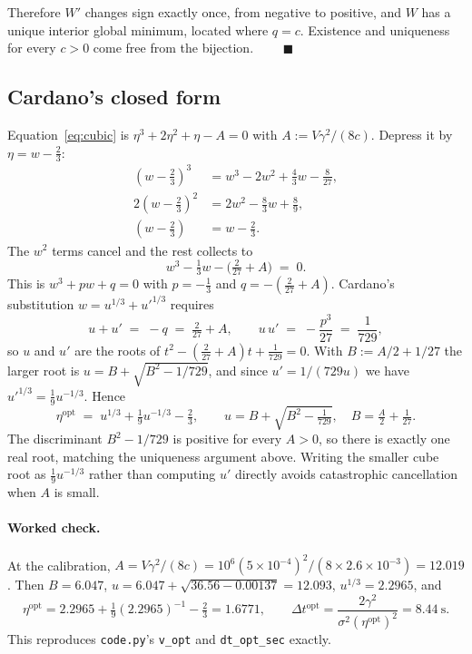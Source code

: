 \documentclass[11pt]{article}
\theoremstyle{definition}
\theoremstyle{remark}
\newcommand{\dt}{\Delta t}
\newcommand{\1}{\mathbf{1}}
\begin{document}
Therefore $W'$ changes sign exactly once, from negative to positive, and $W$ has a unique interior global minimum, located where $q = c$. Existence and uniqueness for every $c > 0$ come free from the bijection. $\qquad\blacksquare$

\subsection{Cardano's closed form}

Equation~\eqref{eq:cubic} is $\eta^3 + 2\eta^2 + \eta - A = 0$ with $A := V\gamma^2/(8c)$. Depress it by $\eta = w - \tfrac23$:
\begin{align*}
(w-\tfrac23)^3 &= w^3 - 2w^2 + \tfrac43 w - \tfrac{8}{27},\\
2(w-\tfrac23)^2 &= 2w^2 - \tfrac83 w + \tfrac89,\\
(w-\tfrac23) &= w - \tfrac23 .
\end{align*}
The $w^2$ terms cancel and the rest collects to
\[
w^3 - \tfrac13 w - \big(\tfrac{2}{27} + A\big) \;=\; 0 .
\]
This is $w^3 + pw + q = 0$ with $p = -\tfrac13$ and $q = -(\tfrac2{27}+A)$. Cardano's substitution $w = u^{1/3} + u'^{1/3}$ requires
\[
u + u' \;=\; -q \;=\; \tfrac{2}{27} + A,
\qquad
u\,u' \;=\; -\frac{p^3}{27} \;=\; \frac{1}{729},
\]
so $u$ and $u'$ are the roots of $t^2 - (\tfrac2{27}+A)t + \tfrac1{729} = 0$. With $B := A/2 + 1/27$ the larger root is $u = B + \sqrt{B^2 - 1/729}$, and since $u' = 1/(729u)$ we have $u'^{1/3} = \tfrac19 u^{-1/3}$. Hence
\begin{equation}\label{eq:cardano}
\boxed{\;\eta^{\mathrm{opt}} \;=\; u^{1/3} + \tfrac19 u^{-1/3} - \tfrac23,
\qquad u = B + \sqrt{B^2 - \tfrac1{729}}, \quad B = \tfrac{A}{2} + \tfrac1{27}. \;}
\end{equation}
The discriminant $B^2 - 1/729$ is positive for every $A > 0$, so there is exactly one real root, matching the uniqueness argument above. Writing the smaller cube root as $\tfrac19u^{-1/3}$ rather than computing $u'$ directly avoids catastrophic cancellation when $A$ is small.

\paragraph{Worked check.} At the calibration, $A = V\gamma^2/(8c) = 10^6(5\times10^{-4})^2/(8\times2.6\times10^{-3}) = 12.019$. Then $B = 6.047$, $u = 6.047 + \sqrt{36.56 - 0.00137} = 12.093$, $u^{1/3} = 2.2965$, and
\[
\eta^{\mathrm{opt}} = 2.2965 + \tfrac19(2.2965)^{-1} - \tfrac23 = 1.6771,
\qquad
\dt^{\mathrm{opt}} = \frac{2\gamma^2}{\sigma^2(\eta^{\mathrm{opt}})^2} = 8.44\ \text{s}.
\]
This reproduces \texttt{code.py}'s \texttt{v\_opt} and \texttt{dt\_opt\_sec} exactly.
\end{document}
